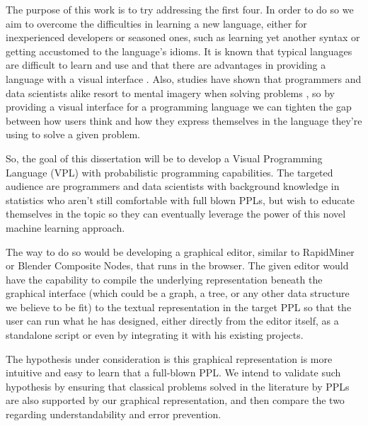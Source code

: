 The purpose of this work is to try addressing the first four. In order to do so we
aim to overcome the difficulties in learning a new language, either for
inexperienced developers or seasoned ones, such as learning yet another syntax
or getting accustomed to the language's idioms. It is known that typical
languages are difficult to learn and use \cite{Lewis1987} and that there are
advantages in providing a language with a visual interface \cite{dfbeg}. Also,
studies have shown that programmers and data scientists alike resort to mental
imagery when solving problems \cite{Dastani2002}\cite{Petre1999}, so by
providing a visual interface for a programming language
we can tighten the gap between how users think and how they
express themselves in the language they're using to solve a given problem.

So, the goal of this dissertation will be to develop a Visual Programming
Language (VPL) with probabilistic programming capabilities. The targeted
audience are programmers and data scientists with background knowledge in
statistics who aren't still comfortable
with full blown PPLs, but wish to educate themselves in the topic so they can
eventually leverage the power of this novel machine learning approach.

The way to do so would be developing a graphical editor, similar to
RapidMiner or Blender Composite Nodes, that runs in the browser. The given
editor would have the capability to compile the underlying representation beneath
the graphical interface (which could be a graph, a tree, or any other data structure
we believe to be fit) to the textual
representation in the target PPL so that the user can run what he has designed,
either directly from the editor itself, as a standalone script or even by
integrating it with his existing projects.

The hypothesis under consideration is this graphical representation
is more intuitive and easy to learn that a full-blown PPL.
We intend to validate such hypothesis by ensuring that classical problems solved
in the literature by PPLs are also supported by our graphical representation,
and then compare the two regarding understandability and error prevention.
